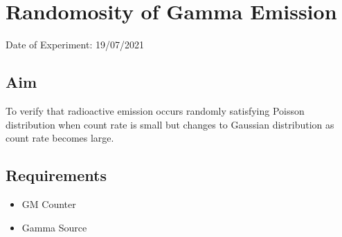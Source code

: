 


	
	\chapter{Randomosity of Gamma Emission} %
	\vspace{-1cm}
	
	\begin{center}%
		Date of Experiment: 19/07/2021
	\end{center}
	
	
	\section{Aim}
		To verify that radioactive emission occurs randomly satisfying Poisson distribution when count rate is small but changes to Gaussian distribution as count rate becomes large.
	
	
	\section{Requirements}
	\begin{itemize}
		\item 	GM Counter
		\item 	Gamma Source
	\end{itemize}
	
